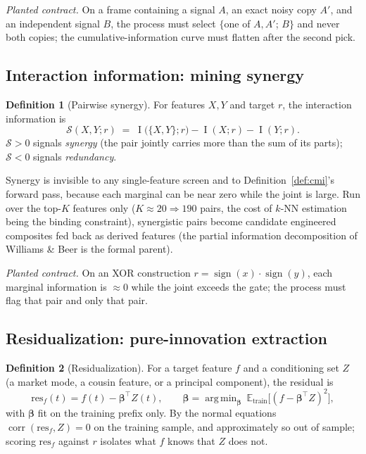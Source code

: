 \documentclass[11pt,a4paper]{article}
\theoremstyle{definition}
\newtheorem{definition}{Definition}[section]
\theoremstyle{plain}
\newcommand{\E}{\mathbb{E}}
\newcommand{\corr}{\operatorname{corr}}
\newcommand{\sgn}{\operatorname{sign}}
\DeclareMathOperator{\MI}{I}
\DeclareMathOperator*{\argmin}{arg\,min}
\begin{document}
\noindent\emph{Planted contract.} On a frame containing a signal $A$, an exact noisy copy $A'$, and
an independent signal $B$, the process must select $\{$one of $A,A'$; $B\}$ and never both copies;
the cumulative-information curve must flatten after the second pick.

\subsection{Interaction information: mining synergy}

\begin{definition}[Pairwise synergy]
\label{def:synergy}
For features $X,Y$ and target $r$, the interaction information is
\[
   \mathcal{S}(X,Y;r) \;=\; \MI\big(\{X,Y\};r\big) - \MI(X;r) - \MI(Y;r).
\]
$\mathcal{S}>0$ signals \emph{synergy} (the pair jointly carries more than the sum of its parts);
$\mathcal{S}<0$ signals \emph{redundancy}.
\end{definition}

Synergy is invisible to any single-feature screen and to Definition~\ref{def:cmi}'s forward pass,
because each marginal can be near zero while the joint is large. Run over the top-$K$ features only
($K\approx 20\Rightarrow 190$ pairs, the cost of $k$-NN estimation being the binding constraint),
synergistic pairs become candidate engineered composites fed back as derived features (the partial
information decomposition of Williams \& Beer is the formal parent).

\noindent\emph{Planted contract.} On an XOR construction $r=\sgn(x)\cdot\sgn(y)$, each marginal
information is $\approx 0$ while the joint exceeds the gate; the process must flag that pair and only
that pair.

\subsection{Residualization: pure-innovation extraction}

\begin{definition}[Residualization]
\label{def:resid}
For a target feature $f$ and a conditioning set $Z$ (a market mode, a cousin feature, or a principal
component), the residual is
\[
   \mathrm{res}_f(t) = f(t) - \boldsymbol{\beta}^{\!\top} Z(t),
   \qquad
   \boldsymbol{\beta} = \argmin_{\boldsymbol{\beta}}\ \E_{\text{train}}\big[(f-\boldsymbol{\beta}^{\!\top} Z)^2\big],
\]
with $\boldsymbol{\beta}$ fit on the training prefix only. By the normal equations
$\corr(\mathrm{res}_f,Z)=0$ on the training sample, and approximately so out of sample; scoring
$\mathrm{res}_f$ against $r$ isolates what $f$ knows that $Z$ does not.
\end{definition}
\end{document}
